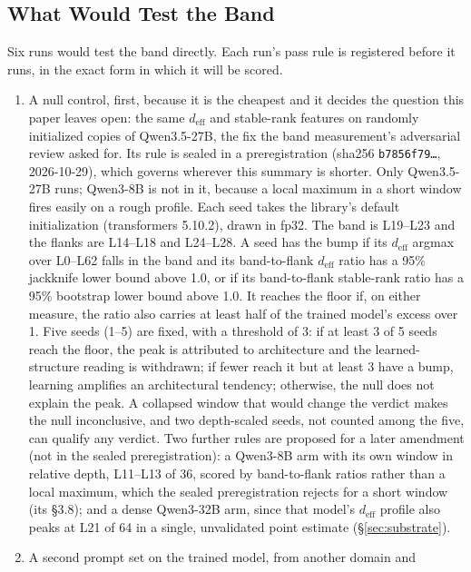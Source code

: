 \documentclass[11pt,a4paper]{article}
\begin{document}
\subsection{What Would Test the Band}
\label{sec:test-band}

Six runs would test the band directly. Each run's pass rule is
registered before it runs, in the exact form in which it will be scored.
\begin{enumerate}[nosep]
\item A null control, first, because it is the cheapest and it decides
  the question this paper leaves open: the same $d_\text{eff}$ and
  stable-rank features on randomly initialized copies of Qwen3.5-27B,
  the fix the band measurement's adversarial review asked for. Its rule
  is sealed in a preregistration (sha256 \texttt{b7856f79\ldots},
  2026-10-29), which governs wherever this summary is shorter. Only
  Qwen3.5-27B runs; Qwen3-8B is not in it, because a local maximum in a
  short window fires easily on a rough profile. Each seed takes the
  library's default initialization (transformers 5.10.2), drawn in fp32.
  The band is L19--L23 and the flanks are L14--L18 and L24--L28. A seed
  has the bump if its $d_\text{eff}$ argmax over L0--L62 falls in the
  band and its band-to-flank $d_\text{eff}$ ratio has a 95\% jackknife
  lower bound above 1.0, or if its band-to-flank stable-rank ratio has a
  95\% bootstrap lower bound above 1.0. It reaches the floor if, on
  either measure, the ratio also carries at least half of the trained
  model's excess over 1. Five seeds (1--5) are fixed, with a threshold
  of 3: if at least 3 of 5 seeds reach the floor, the peak is attributed
  to architecture and the learned-structure reading is withdrawn; if
  fewer reach it but at least 3 have a bump, learning amplifies an
  architectural tendency; otherwise, the null does not explain the
  peak. A collapsed window that would change the verdict makes the null
  inconclusive, and two depth-scaled seeds, not counted among the five,
  can qualify any verdict. Two further rules are proposed for a later
  amendment (not in the sealed preregistration): a Qwen3-8B arm with its
  own window in relative depth, L11--L13 of 36, scored by band-to-flank
  ratios rather than a local maximum, which the sealed preregistration
  rejects for a short window (its \S3.8); and a dense Qwen3-32B arm,
  since that model's $d_\text{eff}$ profile also peaks at L21 of 64 in a
  single, unvalidated point estimate (\S\ref{sec:substrate}).
\item A second prompt set on the trained model, from another domain and

\end{enumerate}
\end{document}
